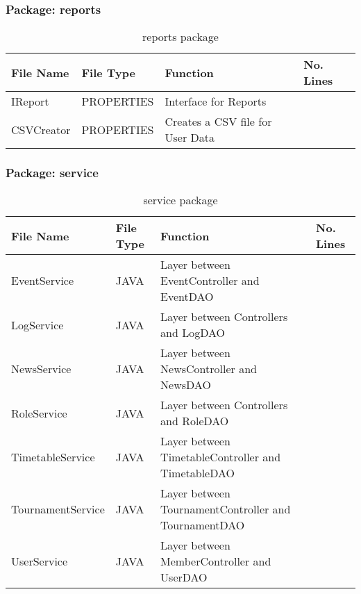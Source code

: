 \subsubsection{Package: reports}
\begin{table}[H]
\begin{center}
     \begin{tabular}{| l | l | l| p{1cm} |}
    \hline
    File Name & File Type & Function & No. Lines\\ \hline
    IReport & PROPERTIES & Interface for Reports\\ \hline
	CSVCreator & PROPERTIES & Creates a CSV file for User Data\\ \hline
    \end{tabular}
\end{center}
\caption{reports package}
\end{table}

\subsubsection{Package: service}
\begin{table}[H]
\begin{center}
     \begin{tabular}{| l | l | l| p{1cm} |}
    \hline
    File Name & File Type & Function & No. Lines\\ \hline
    EventService & JAVA & Layer between EventController and EventDAO\\ \hline
    LogService & JAVA & Layer between Controllers and LogDAO\\ \hline
	NewsService & JAVA & Layer between NewsController and NewsDAO\\ \hline
	RoleService & JAVA & Layer between Controllers and RoleDAO\\ \hline
	TimetableService & JAVA & Layer between TimetableController and TimetableDAO\\ \hline
	TournamentService & JAVA & Layer between TournamentController and TournamentDAO\\ \hline
	UserService & JAVA & Layer between MemberController and UserDAO\\ \hline
    \end{tabular}
\end{center}
\caption{service package}
\end{table}

